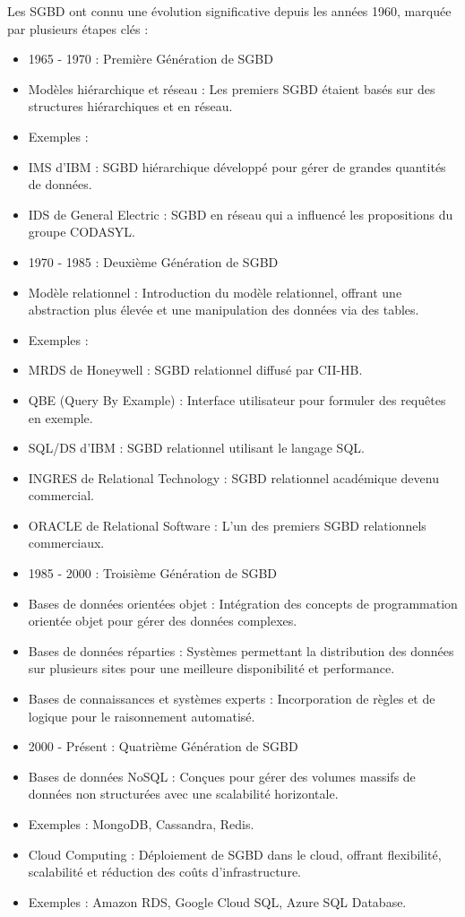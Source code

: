 \documentclass{article}
\begin{document}
Les SGBD ont connu une évolution significative depuis les années 1960, marquée par plusieurs étapes clés :
\begin{itemize}
  \item 1965 - 1970 : Première Génération de SGBD
  \item Modèles hiérarchique et réseau : Les premiers SGBD étaient basés sur des structures hiérarchiques et en réseau.
  \item Exemples :
  \item IMS d’IBM : SGBD hiérarchique développé pour gérer de grandes quantités de données.
  \item IDS de General Electric : SGBD en réseau qui a influencé les propositions du groupe CODASYL.
  \item 1970 - 1985 : Deuxième Génération de SGBD
  \item Modèle relationnel : Introduction du modèle relationnel, offrant une abstraction plus élevée et une manipulation des données via des tables.
  \item Exemples :
  \item MRDS de Honeywell : SGBD relationnel diffusé par CII-HB.
  \item QBE (Query By Example) : Interface utilisateur pour formuler des requêtes en exemple.
  \item SQL/DS d’IBM : SGBD relationnel utilisant le langage SQL.
  \item INGRES de Relational Technology : SGBD relationnel académique devenu commercial.
  \item ORACLE de Relational Software : L’un des premiers SGBD relationnels commerciaux.
  \item 1985 - 2000 : Troisième Génération de SGBD
  \item Bases de données orientées objet : Intégration des concepts de programmation orientée objet pour gérer des données complexes.
  \item Bases de données réparties : Systèmes permettant la distribution des données sur plusieurs sites pour une meilleure disponibilité et performance.
  \item Bases de connaissances et systèmes experts : Incorporation de règles et de logique pour le raisonnement automatisé.
  \item 2000 - Présent : Quatrième Génération de SGBD
  \item Bases de données NoSQL : Conçues pour gérer des volumes massifs de données non structurées avec une scalabilité horizontale.
  \item Exemples : MongoDB, Cassandra, Redis.
  \item Cloud Computing : Déploiement de SGBD dans le cloud, offrant flexibilité, scalabilité et réduction des coûts d’infrastructure.
  \item Exemples : Amazon RDS, Google Cloud SQL, Azure SQL Database.
\end{itemize}
\end{document}
